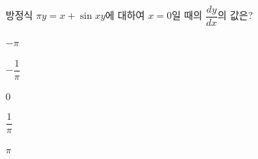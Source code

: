 방정식 $\pi y=x+\sin xy$에 대하여 $x=0$일 때의 $\dfrac{dy}{dx}$의 값은?
\begin{choices32}{\rule[-3ex]{0pt}{8ex}$-\pi$}{\rule[-3ex]{0pt}{8ex}$-\dfrac{1}{\pi}$}{\rule[-3ex]{0pt}{8ex}$0$}{\rule[-3ex]{0pt}{8ex}$\dfrac{1}{\pi}$}{\rule[-3ex]{0pt}{8ex}$\pi$}\end{choices32}
